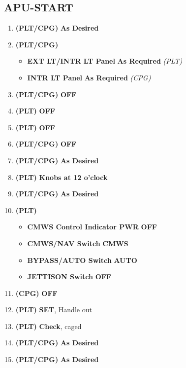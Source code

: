 \documentclass[fontHelvetica]{TechCheck}
\begin{document}
	\subsection{APU-START}
	\begin{enumerate}[leftmargin=0.1\linewidth,rightmargin=0.1\linewidth, itemsep=4pt]
		\item {} \textbf{(PLT/CPG)} \dotfill \textbf{As Desired}
		\item {} \textbf{(PLT/CPG)}
		\begin{itemize}[itemsep=4pt]
			\item \textbf{EXT LT/INTR LT Panel} \dotfill \textbf{As Required}
			\emph{(PLT)}
			\item \textbf{INTR LT Panel} \dotfill \textbf{As Required}
			\emph{(CPG)}
		\end{itemize}
		\item {} \textbf{(PLT/CPG)} \dotfill \textbf{OFF}
		\item {} \textbf{(PLT)} \dotfill \textbf{OFF}
		\item {} \textbf{(PLT)} \dotfill \textbf{OFF}
		\item {} \textbf{(PLT/CPG)} \dotfill \textbf{OFF}
		\item {} \textbf{(PLT/CPG)} \dotfill \textbf{As Desired}
		\item {} \textbf{(PLT)} \dotfill \textbf{Knobs at 12 o'clock}
		\item {} \textbf{(PLT/CPG)} \dotfill \textbf{As Desired}
		\item {} \textbf{(PLT)} 
		\begin{itemize}[itemsep=4pt]
			\item \textbf{CMWS Control Indicator PWR} \dotfill \textbf{OFF}
			\item \textbf{CMWS/NAV Switch} \dotfill \textbf{CMWS}
			\item \textbf{BYPASS/AUTO Switch} \dotfill \textbf{AUTO}
			\item \textbf{JETTISON Switch} \dotfill \textbf{OFF}
		\end{itemize}
		\item {} \textbf{(CPG)} \dotfill \textbf{OFF}
		\item {} \textbf{(PLT)} \dotfill \textbf{SET}, Handle out
		\item {} \textbf{(PLT)} \dotfill \textbf{Check}, caged
		\item {} \textbf{(PLT/CPG)} \dotfill \textbf{As Desired}
		\item {} \textbf{(PLT/CPG)} \dotfill \textbf{As Desired}
	\end{enumerate}
\end{document}
